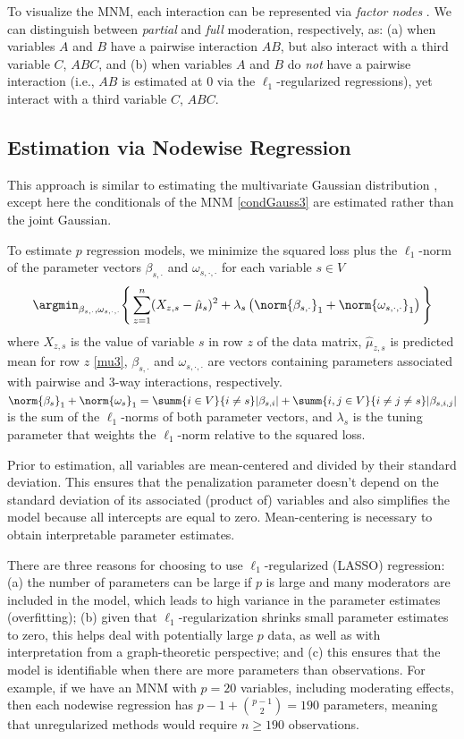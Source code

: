 To visualize the MNM, each interaction can be represented via \textit{factor nodes} \cite{koller2009}. We can distinguish between \textit{partial} and \textit{full} moderation, respectively, as: (a) when variables $A$ and $B$ have a pairwise interaction $AB$, but also interact with a third variable $C$, $ABC$, and (b) when variables $A$ and $B$ do \textit{not} have a pairwise interaction (i.e., $AB$ is estimated at 0 via the $\ell_1$-regularized regressions), yet interact with a third variable $C$, $ABC$.

\subsection{Estimation via Nodewise Regression}
This approach is similar to estimating the multivariate Gaussian distribution \cite{meinshausen2006high}, except here the conditionals of the MNM \eqref{condGauss3} are estimated rather than the joint Gaussian. 

To estimate $p$ regression models, we minimize the squared loss plus the $\ell_1$-norm of the parameter vectors $\beta_{s,\cdot}$ and $\omega_{s,\cdot,\cdot}$ for each variable $s \in V$
\begin{equation} \label{lassoMNM}
    \argmin_{\beta_{s,\cdot},\omega_{s,\cdot,\cdot}} \Bigg\{\sum_{z=1}^n (X_{z,s} - \hat{\mu}_s)^2 + \lambda_s \left(\norm{\beta_{s,\cdot}}_1 + \norm{\omega_{s,\cdot,\cdot}}_1\right)\Bigg\}
\end{equation}
where $X_{z,s}$ is the value of variable $s$ in row $z$ of the data matrix, $\hat{\mu}_{z,s}$ is predicted mean for row $z$ \eqref{mu3}, $\beta_{s,\cdot}$ and $\omega_{s,\cdot,\cdot}$ are vectors containing parameters associated with pairwise and 3-way interactions, respectively. $\norm{\beta_s}_1 + \norm{\omega_s}_1 = \summ{i \in V}{i \neq s} |\beta_{s,i}| + \summ{i,j \in V}{i \neq j \neq s} |\beta_{s,i,j}|$ is the sum of the $\ell_1$-norms of both parameter vectors, and $\lambda_s$ is the tuning parameter that weights the $\ell_1$-norm relative to the squared loss. 

Prior to estimation, all variables are mean-centered and divided by their standard deviation. This ensures that the penalization parameter doesn't depend on the standard deviation of its associated (product of) variables and also simplifies the model because all intercepts are equal to zero. Mean-centering is necessary to obtain interpretable parameter estimates.

There are three reasons for choosing to use $\ell_1$-regularized (LASSO) regression: (a) the number of parameters can be large if $p$ is large and many moderators are included in the model, which leads to high variance in the parameter estimates (overfitting); (b) given that $\ell_1$-regularization shrinks small parameter estimates to zero, this helps deal with potentially large $p$ data, as well as with interpretation from a graph-theoretic perspective; and (c) this ensures that the model is identifiable when there are more parameters than observations. For example, if we have an MNM with $p=20$ variables, including moderating effects, then each nodewise regression has $p-1 + \binom{p-1}{2}=190$ parameters, meaning that unregularized methods would require $n \geq 190$ observations.

